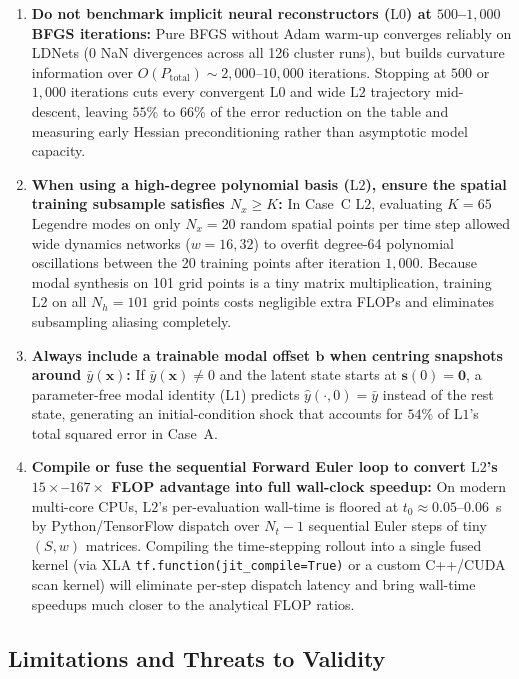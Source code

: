 \begin{enumerate}[leftmargin=2em]
  \item \textbf{Do not benchmark implicit neural reconstructors ($\mathrm{L0}$) at $500$--$1{,}000$ BFGS iterations:} Pure BFGS without Adam warm-up converges reliably on LDNets (0 NaN divergences across all 126 cluster runs), but builds curvature information over $O(P_{\mathrm{total}}) \sim 2{,}000$--$10{,}000$ iterations. Stopping at $500$ or $1{,}000$ iterations cuts every convergent $\mathrm{L0}$ and wide $\mathrm{L2}$ trajectory mid-descent, leaving $55\%$ to $66\%$ of the error reduction on the table and measuring early Hessian preconditioning rather than asymptotic model capacity.
  \item \textbf{When using a high-degree polynomial basis ($\mathrm{L2}$), ensure the spatial training subsample satisfies $N_x \ge K$:} In Case~C $\mathrm{L2}$, evaluating $K = 65$ Legendre modes on only $N_x = 20$ random spatial points per time step allowed wide dynamics networks ($w = 16, 32$) to overfit degree-64 polynomial oscillations between the 20 training points after iteration $1{,}000$. Because modal synthesis on 101 grid points is a tiny matrix multiplication, training $\mathrm{L2}$ on all $N_h = 101$ grid points costs negligible extra FLOPs and eliminates subsampling aliasing completely.
  \item \textbf{Always include a trainable modal offset $\mathbf{b}$ when centring snapshots around $\bar{y}(\mathbf{x})$:} If $\bar{y}(\mathbf{x}) \ne 0$ and the latent state starts at $\mathbf{s}(0) = \mathbf{0}$, a parameter-free modal identity ($\mathrm{L1}$) predicts $\hat{y}(\cdot,0) = \bar{y}$ instead of the rest state, generating an initial-condition shock that accounts for $54\%$ of $\mathrm{L1}$'s total squared error in Case~A.
  \item \textbf{Compile or fuse the sequential Forward Euler loop to convert $\mathrm{L2}$'s $15\times$--$167\times$ FLOP advantage into full wall-clock speedup:} On modern multi-core CPUs, $\mathrm{L2}$'s per-evaluation wall-time is floored at $t_0 \approx 0.05$--$0.06$~s by Python/TensorFlow dispatch over $N_t - 1$ sequential Euler steps of tiny $(S, w)$ matrices. Compiling the time-stepping rollout into a single fused kernel (via XLA \texttt{tf.function(jit\_compile=True)} or a custom C++/CUDA scan kernel) will eliminate per-step dispatch latency and bring wall-time speedups much closer to the analytical FLOP ratios.
\end{enumerate}

\subsection{Limitations and Threats to Validity}
\label{sec:rq2_limitations}

